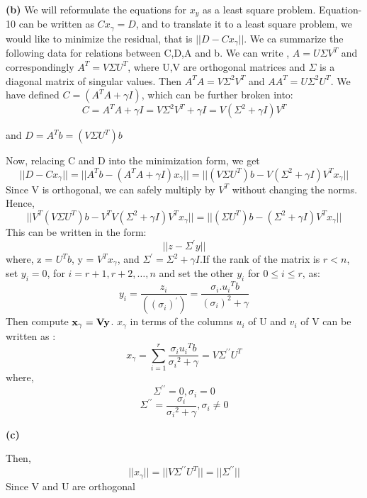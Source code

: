 \documentclass{article}
\renewcommand\part[1]{\vspace{.10in}\textbf{(#1)}}
\begin{document}
 \part{b} 
 We will reformulate the equations for $x_{y}$ as a least square problem. Equation-10 can be written as $Cx_\gamma = D$, and to translate it to a least square problem, we would like to minimize the residual, that is $||D - Cx_\gamma||$. We ca summarize the following data for relations between C,D,A and b. \newline
 We can write , $A = U\Sigma V^T$ and correspondingly $A^T = V\Sigma U^T$, where U,V are orthogonal matrices and $\Sigma$ is a diagonal matrix of singular values. Then $A^TA = V \Sigma^2 V^T$ and $AA^T = U\Sigma^2 U^T$. We have defined $C = (A^TA + \gamma I)$, which can be further broken into: \newline
 \[C = A^TA + \gamma I = V\Sigma^2V^T + \gamma I = V(\Sigma^2 + \gamma I)V^T\]

 and $D = A^Tb = (V\Sigma U^T)b$ \newline

 Now, relacing C and D into the minimization form, we get
 \[ ||D - Cx_\gamma|| = ||A^Tb - (A^TA + \gamma I)x_\gamma|| = || (V\Sigma U^T)b - V(\Sigma^2 + \gamma I)V^T x_\gamma|| \]
 Since V is orthogonal, we can safely multiply by $V^T$ without changing the norms. Hence,
 \[|| V^T(V\Sigma U^T)b - V^TV(\Sigma^2 + \gamma I)V^T x_\gamma|| = || (\Sigma U^T)b - (\Sigma^2 + \gamma I)V^T x_\gamma||\]
 This can be written in the form:
 \[||z - \Sigma^\prime y ||\]
 where, z = $U^Tb$, y = $V^Tx_\gamma$, and $\Sigma^\prime = \Sigma^2 + \gamma I$.If the rank of the matrix is $r < n$, set $y_i = 0$, for $i=r+1,r+2,\dots,n $ and set the other $y_i$ for $0 \leq i \leq r$, as:
 \[ y_i = \dfrac{z_i}{((\sigma_i)^\prime)} = \dfrac{\sigma_i . {u_{i}}^Tb}{(\sigma_i)^2 + \gamma}\]
 Then compute $\bf {x_\gamma=Vy} $. $x_\gamma$ in terms of the columns $u_i$ of U and $v_i$ of V can be written as : 
 \[x_\gamma = \sum_{i=1}^r \dfrac{\sigma_i {u_i}^Tb}{{\sigma_i}^2 + \gamma} = V\Sigma^{\prime\prime}U^T\]
 where, 
 \[\Sigma^{\prime\prime} = 0, \sigma_i = 0\]
 \[\Sigma^{\prime\prime} = \dfrac{\sigma_i}{{\sigma_i}^2 + \gamma}, \sigma_i \neq 0\]

\part{c}

 Then, 
 \[||x_\gamma|| = ||V\Sigma^{\prime\prime}U^T|| = ||\Sigma^{\prime\prime}||\]
 Since V and U are orthogonal
\end{document}
